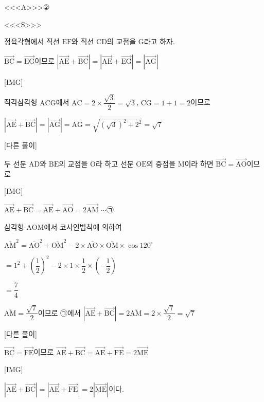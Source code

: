 \documentclass{oblivoir}
\begin{document}
<<<A>>>②

<<<S>>>

정육각형에서 직선 $\mathrm{EF}$와 직선 $\mathrm{CD}$의 교점을 $\mathrm{G}$라고 하자.

$\overrightarrow{\mathrm{BC}}=\overrightarrow{\mathrm{EG}}$이므로 $|\overrightarrow{\mathrm{AE}}+\overrightarrow{\mathrm{BC}}| = |\overrightarrow{\mathrm{AE}}+\overrightarrow{\mathrm{EG}}| = |\overrightarrow{\mathrm{AG}}|$

[IMG]

직각삼각형 $\mathrm{ACG}$에서 $\overline{\mathrm{AC}}= 2\times\dfrac{\sqrt{3}}{2}=\sqrt{3}$, $\overline{\mathrm{CG}}=1+1=2$이므로

$|\overrightarrow{\mathrm{AE}}+\overrightarrow{\mathrm{BC}}| = |\overrightarrow{\mathrm{AG}}| =\overline{\mathrm{AG}}=\sqrt{(\sqrt{3})^{2}+2^{2}}=\sqrt{7}$

[다른 풀이]

두 선분  $\mathrm{AD}$와 $\mathrm{BE}$의 교점을 $\mathrm{O}$라 하고 선분 $\mathrm{OE}$의 중점을 $\mathrm{M}$이라 하면 $\overrightarrow{\mathrm{BC}}=\overrightarrow{\mathrm{AO}}$이므로

[IMG]

$\overrightarrow{\mathrm{AE}}+\overrightarrow{\mathrm{BC}}=\overrightarrow{\mathrm{AE}}+\overrightarrow{\mathrm{AO}}=2\overrightarrow{\mathrm{AM}}$ $\cdots$㉠

삼각형 $\mathrm{AOM}$에서 코사인법칙에 의하여 

$\overline{\mathrm{AM}}^{2}$$=\overline{\mathrm{AO}}^{2}+\overline{\mathrm{OM}}^{2}-2\times\overline{\mathrm{AO}}\times\overline{\mathrm{OM}}\times\cos 120^{\circ}$

$=1^{2}+\left(\dfrac{1}{2}\right)^{2}-2\times 1\times\dfrac{1}{2}\times\left(-\dfrac{1}{2}\right)$

$=\dfrac{7}{4}$

$\overline{\mathrm{AM}}=\dfrac{\sqrt{7}}{2}$이므로 ㉠에서 $|\overrightarrow{\mathrm{AE}}+\overrightarrow{\mathrm{BC}}| =2\overline{\mathrm{AM}}=2\times\dfrac{\sqrt{7}}{2}=\sqrt{7}$

[다른 풀이]

$\overrightarrow{\mathrm{BC}}=\overrightarrow{\mathrm{FE}}$이므로 $\overrightarrow{\mathrm{AE}}+\overrightarrow{\mathrm{BC}}=\overrightarrow{\mathrm{AE}}+\overrightarrow{\mathrm{FE}}= 2\overrightarrow{\mathrm{ME}}$

[IMG]

$|\overrightarrow{\mathrm{AE}}+\overrightarrow{\mathrm{BC}}| = |\overrightarrow{\mathrm{AE}}+\overrightarrow{\mathrm{FE}}| = 2 |\overrightarrow{\mathrm{ME}}|$이다. 
\end{document}
